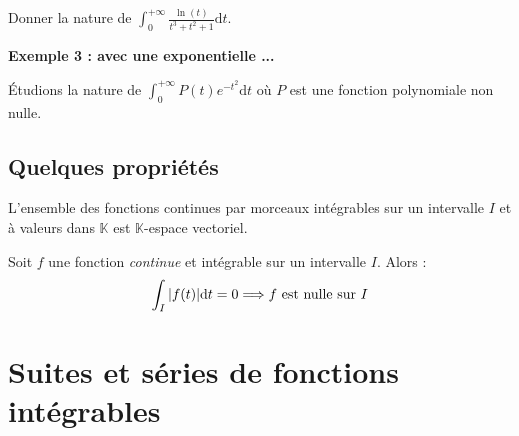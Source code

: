 \documentclass[french,11pt,twoside]{VcCours}
\newcommand{\dt}{\text{d}t}
\begin{document}
\begin{ApplicationDirecte}{} Donner la nature de $\int_{0}^{+ \infty} \frac{\ln(t)}{t^3+t^2+1} \dt$.
\end{ApplicationDirecte}

%
%
%
%
%
%
%
%
%

\textbf{Exemple 3 : avec une exponentielle ...}

Étudions la nature de $\int_{0}^{+ \infty} P(t) e^{-t^2} \dt$ où $P$ est une fonction polynomiale non nulle.

\vspace{6cm}


%

\subsection{Quelques propriétés}

\begin{Theoreme}{} L'ensemble des fonctions continues par morceaux intégrables sur un intervalle $I$ et à valeurs dans $\mathbb{K}$ est $\mathbb{K}$-espace vectoriel.
\end{Theoreme}

\begin{Proposition}{} Soit $f$ une fonction \emph{continue} et intégrable sur un intervalle $I$. Alors :
$$ \int_{I} \vert f(t) \vert \dt=0 \Longrightarrow f \hbox{ est nulle sur } I $$
\end{Proposition}

\section{Suites et séries de fonctions intégrables}
\end{document}
